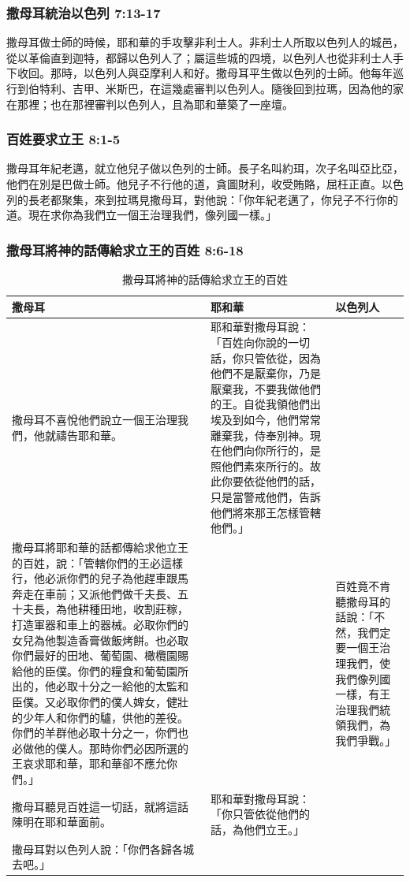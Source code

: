 \subsubsection{撒母耳統治以色列 7:13-17}
撒母耳做士師的時候，耶和華的手攻擊非利士人。非利士人所取以色列人的城邑，從以革倫直到迦特，都歸以色列人了；屬這些城的四境，以色列人也從非利士人手下收回。那時，以色列人與亞摩利人和好。撒母耳平生做以色列的士師。他每年巡行到伯特利、吉甲、米斯巴，在這幾處審判以色列人。隨後回到拉瑪，因為他的家在那裡；也在那裡審判以色列人，且為耶和華築了一座壇。

\subsubsection{百姓要求立王 8:1-5}
撒母耳年紀老邁，就立他兒子做以色列的士師。長子名叫約珥，次子名叫亞比亞，他們在別是巴做士師。他兒子不行他的道，貪圖財利，收受賄賂，屈枉正直。以色列的長老都聚集，來到拉瑪見撒母耳，對他說：「你年紀老邁了，你兒子不行你的道。現在求你為我們立一個王治理我們，像列國一樣。」 

\subsubsection{撒母耳將神的話傳給求立王的百姓 8:6-18}
\begin{table}[H]
\centering 
\begin{tabular}{p{8.5cm}|p{6.5cm}|p{1.9cm}}
\hline
\hline
撒母耳&耶和華&以色列人\\\hline
撒母耳不喜悅他們說立一個王治理我們，他就禱告耶和華。
&耶和華對撒母耳說：「百姓向你說的一切話，你只管依從，因為他們不是厭棄你，乃是厭棄我，不要我做他們的王。自從我領他們出埃及到如今，他們常常離棄我，侍奉別神。現在他們向你所行的，是照他們素來所行的。故此你要依從他們的話，只是當警戒他們，告訴他們將來那王怎樣管轄他們。」&\\\hline
撒母耳將耶和華的話都傳給求他立王的百姓，說：「管轄你們的王必這樣行，他必派你們的兒子為他趕車跟馬奔走在車前；又派他們做千夫長、五十夫長，為他耕種田地，收割莊稼，打造軍器和車上的器械。必取你們的女兒為他製造香膏做飯烤餅。也必取你們最好的田地、葡萄園、橄欖園賜給他的臣僕。你們的糧食和葡萄園所出的，他必取十分之一給他的太監和臣僕。又必取你們的僕人婢女，健壯的少年人和你們的驢，供他的差役。你們的羊群他必取十分之一，你們也必做他的僕人。那時你們必因所選的王哀求耶和華，耶和華卻不應允你們。」
&&百姓竟不肯聽撒母耳的話說：「不然，我們定要一個王治理我們，使我們像列國一樣，有王治理我們統領我們，為我們爭戰。」 \\\hline

撒母耳聽見百姓這一切話，就將這話陳明在耶和華面前。&耶和華對撒母耳說：「你只管依從他們的話，為他們立王。」&\\\hline
撒母耳對以色列人說：「你們各歸各城去吧。」
&&\\\hline
\end{tabular}
\caption{撒母耳將神的話傳給求立王的百姓}
\end{table}

